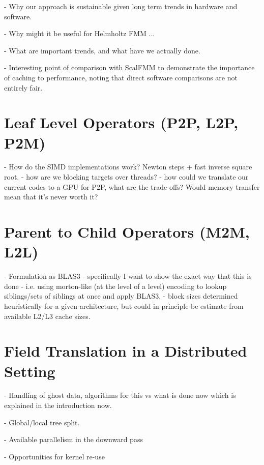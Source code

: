 - Why our approach is sustainable given long term trends in hardware and software.

- Why might it be useful for Helmholtz FMM ...

- What are important trends, and what have we actually done.

- Interesting point of comparison with ScalFMM to demonstrate the importance of caching to performance, noting that direct software comparisons are not entirely fair.



\section{Leaf Level Operators (P2P, L2P, P2M)}

- How do the SIMD implementations work? Newton steps + fast inverse square root.
- how are we blocking targets over threads?
- how could we translate our current codes to a GPU for P2P, what are the trade-offs? Would memory transfer mean that it's never worth it?

\section{Parent to Child Operators (M2M, L2L)}

- Formulation as BLAS3
    - specifically I want to show the exact way that this is done
    - i.e. using morton-like (at the level of a level) encoding to lookup siblings/sets of siblings at once and apply BLAS3.
    - block sizes determined heuristically for a given architecture, but could in principle be estimate from available L2/L3 cache sizes.

\section{Field Translation in a Distributed Setting}

- Handling of ghost data, algorithms for this vs what is done now which is explained in the introduction now.

- Global/local tree split.

- Available parallelism in the downward pass

- Opportunities for kernel re-use